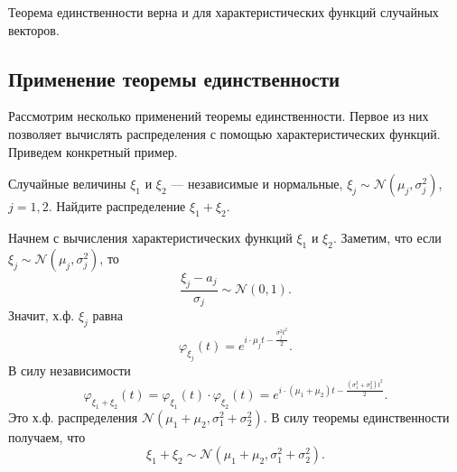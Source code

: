 \begin{remark}[Замечание 4.3]
    Теорема единственности верна и для характеристических функций случайных векторов.
\end{remark}

\vspace{1em}

\subsection{Применение теоремы единственности}

Рассмотрим несколько применений теоремы единственности. Первое из них позволяет вычислять распределения с помощью характеристических функций. Приведем конкретный пример.

\noindent\hypertarget{ex:sum_normal}{}
\begin{tcolorbox}[notionstyle=thmblue, title={\textbf{Упражнение 4.1}}]
    \label{ex:sum_normal}
    Случайные величины $\xi_1$ и $\xi_2$ --- независимые и нормальные, $\xi_j \sim \mathcal{N}(\mu_j, \sigma_j^2)$, $j = 1, 2$. Найдите распределение $\xi_1 + \xi_2$.
\end{tcolorbox}
\begin{proofbox}[Решение]
    Начнем с вычисления характеристических функций $\xi_1$ и $\xi_2$. Заметим, что если $\xi_j \sim \mathcal{N}(\mu_j, \sigma_j^2)$, то
    \begin{equation*}
        \frac{\xi_j - a_j}{\sigma_j} \sim \mathcal{N}(0, 1).
    \end{equation*}
    Значит, х.ф. $\xi_j$ равна
    \begin{equation*}
        \varphi_{\xi_j}(t) = e^{i\cdot\mu_j t - \frac{\sigma_j^2 t^2}{2}}.
    \end{equation*}
    В силу независимости
    \begin{equation*}
        \varphi_{\xi_1 + \xi_2}(t) = \varphi_{\xi_1}(t) \cdot \varphi_{\xi_2}(t) = e^{i\cdot(\mu_1 + \mu_2)t - \frac{(\sigma_1^2 + \sigma_2^2)t^2}{2}}.
    \end{equation*}
    Это х.ф. распределения $\mathcal{N}(\mu_1 + \mu_2, \sigma_1^2 + \sigma_2^2)$. В силу теоремы единственности получаем, что
    \begin{equation*}
        \xi_1 + \xi_2 \sim \mathcal{N}(\mu_1 + \mu_2, \sigma_1^2 + \sigma_2^2).
    \end{equation*}
\end{proofbox}

\vspace{1em}

